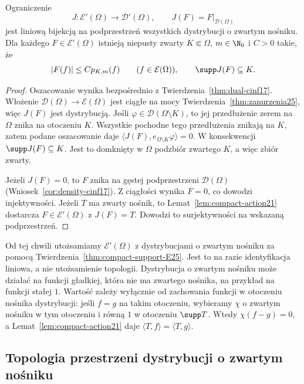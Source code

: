 \begin{twierdzenie}
\label{thm:compact-support-E25}
Ograniczenie
\[
 J:\mathcal E'(\Omega)\longrightarrow\mathcal D'(\Omega),
 \qquad J(F)=F|_{\mathcal D(\Omega)}
\]
jest liniową bijekcją na podprzestrzeń wszystkich
dystrybucji o zwartym nośniku.
Dla każdego $F\in\mathcal E'(\Omega)$ istnieją
niepusty zwarty $K\Subset\Omega$, $m\in\N_0$ i $C>0$
takie, że
\[
 |F(f)|\le C p_{K,m}(f)\qquad(f\in\mathcal E(\Omega)),
 \qquad \supp J(F)\subseteq K.
\]
\end{twierdzenie}
\begin{proof}
Oszacowanie wynika bezpośrednio z
Twierdzenia~\ref{thm:dual-cinf17}.
Włożenie $\mathcal D(\Omega)\to\mathcal E(\Omega)$
jest ciągłe na mocy Twierdzenia~\ref{thm:zanurzenia25},
więc $J(F)$ jest dystrybucją.
Jeśli $\varphi\in\mathcal D(\Omega\setminus K)$,
to jej przedłużenie zerem na $\Omega$ znika na
otoczeniu $K$. Wszystkie pochodne tego przedłużenia
znikają na $K$, zatem podane oszacowanie daje
$\langle J(F),e_{\Omega\setminus K}\varphi\rangle=0$.
W konsekwencji $\supp J(F)\subseteq K$.
Jest to domknięty w $\Omega$ podzbiór zwartego $K$,
a więc zbiór zwarty.

Jeżeli $J(F)=0$, to $F$ znika na gęstej podprzestrzeni
$\mathcal D(\Omega)$ (Wniosek~\ref{cor:density-cinf17}).
Z ciągłości wynika $F=0$, co dowodzi injektywności.
Jeżeli $T$ ma zwarty nośnik, to Lemat~\ref{lem:compact-action21}
dostarcza $F\in\mathcal E'(\Omega)$ z $J(F)=T$.
Dowodzi to surjektywności na wskazaną podprzestrzeń.
\end{proof}

\begin{uwaga}
\label{rem:Eprime21}
Od tej chwili utożsamiamy $\mathcal E'(\Omega)$
z dystrybucjami o zwartym nośniku za pomocą
Twierdzenia~\ref{thm:compact-support-E25}.
Jest to na razie identyfikacja liniowa, a nie
utożsamienie topologii.
Dystrybucja o zwartym nośniku może działać na funkcji
gładkiej, która nie ma zwartego nośnika, na przykład
na funkcji stałej $1$. Wartość zależy wyłącznie
od zachowania funkcji w otoczeniu nośnika dystrybucji:
jeśli $f=g$ na takim otoczeniu, wybieramy $\chi$
o zwartym nośniku w tym otoczeniu i równą $1$
w otoczeniu $\supp T$. Wtedy $\chi(f-g)=0$,
a Lemat~\ref{lem:compact-action21} daje
$\langle T,f\rangle=\langle T,g\rangle$.
\end{uwaga}

\subsection{Topologia przestrzeni dystrybucji o zwartym nośniku}

